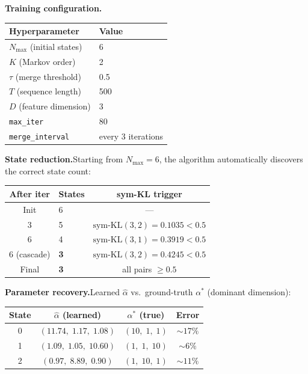 \documentclass[10pt,a4paper,twocolumn]{article}
\newcommand{\symKL}{\mathrm{sym\text{-}KL}}
\begin{document}
\textbf{Training configuration.}

\begin{center}
\footnotesize
\begin{tabular}{@{}ll@{}}
\toprule
\textbf{Hyperparameter} & \textbf{Value} \\
\midrule
$N_{\max}$ (initial states)   & 6 \\
$K$ (Markov order)            & 2 \\
$\tau$ (merge threshold)      & 0.5 \\
$T$ (sequence length)         & 500 \\
$D$ (feature dimension)       & 3 \\
\texttt{max\_iter}            & 80 \\
\texttt{merge\_interval}      & every 3 iterations \\
\bottomrule
\end{tabular}
\end{center}

\textbf{State reduction.}\enspace Starting from $N_{\max}=6$, the algorithm automatically discovers the correct state count:

\begin{center}
\footnotesize
\begin{tabular}{@{}clc@{}}
\toprule
\textbf{After iter} & \textbf{States} & \textbf{sym-KL trigger} \\
\midrule
Init         & 6              & ---                              \\
3            & 5              & $\symKL(3,2)=0.1035<0.5$         \\
6            & 4              & $\symKL(3,1)=0.3919<0.5$         \\
6 (cascade)  & \textbf{3}     & $\symKL(3,2)=0.4245<0.5$         \\
Final        & \textbf{3}     & all pairs $\geq 0.5$             \\
\bottomrule
\end{tabular}
\end{center}

\textbf{Parameter recovery.}\enspace Learned $\hat{\alpha}$ vs.\ ground-truth $\alpha^{*}$ (dominant dimension):

\begin{center}
\footnotesize
\begin{tabular}{@{}cccc@{}}
\toprule
\textbf{State} & $\hat{\alpha}$ (learned) & $\alpha^*$ (true) & \textbf{Error} \\
\midrule
0 & $(11.74,\;1.17,\;1.08)$ & $(10,\;1,\;1)$ & ${\sim}17\%$ \\
1 & $(1.09,\;1.05,\;10.60)$ & $(1,\;1,\;10)$ & ${\sim}6\%$  \\
2 & $(0.97,\;8.89,\;0.90)$  & $(1,\;10,\;1)$ & ${\sim}11\%$ \\
\bottomrule
\end{tabular}
\end{center}
\end{document}
